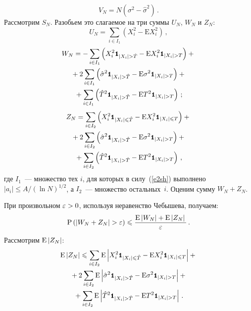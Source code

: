 \begin{multicols}{2}
\noindent
$$
V_N=N\left(\sigma^2-\hat{\sigma}^2\right)\,.
$$
Рассмотрим $S_N$. Разобьем это слагаемое на три суммы $U_N$, $W_N$ и $Z_N$:
$$
U_N=\sum\limits_{i\in I_1}\left(X_i^2-\mbox{E}X_i^2\right)\,,
$$
\begin{multline*}
W_N=-\sum\limits_{i\in I_1}\left(X_i^2\Ik_{|X_i|> \hat{T}}-\mbox{E}X_i^2\Ik_{|X_i|>T}\right)+{}\\
{}+2\sum\limits_{i\in I_1}\left(\hat{\sigma}^2\Ik_{|X_i|> \hat{T}}-\mbox{E}\sigma^2\Ik_{|X_i|> T}\right)+{}\\
{}+ \sum\limits_{i\in I_1}\left(\hat{T}^2\Ik_{|X_i|> 
\hat{T}}-\mbox{E}T^2\Ik_{|X_i|> T}\right)\,;
\end{multline*}
\begin{multline*}
Z_N=\sum\limits_{i\in I_2}\left(X_i^2\Ik_{|X_i|\leqslant 
\hat{T}}-\mbox{E}X_i^2\Ik_{|X_i|\leqslant T}\right)+{}\\
{}+
2\sum\limits_{i\in I_2}\left(\hat{\sigma}^2\Ik_{|X_i|> \hat{T}}-\mbox{E}\sigma^2\Ik_{|X_i|> T}\right)+{}\\
{}+\sum\limits_{i\in I_2}\left(\hat{T}^2\Ik_{|X_i|> \hat{T}}-\mbox{E}T^2\Ik_{|X_i|> T}\right)\,,
\end{multline*}
где $I_1$~--- множество тех $i$, для которых в силу~(\ref{e2sh}) выполнено 
$|a_i|\leqslant{A}/{(\ln N)^{1/2}}$, а $I_2$~--- множество остальных~$i$. 
Оценим сумму $W_N+Z_N$.

При произвольном $\varepsilon>0$, используя неравенство Чебышева, получаем:
$$
\mbox{P}\left(\left\vert W_N+Z_N\right\vert>\varepsilon\right)\leqslant
\displaystyle\frac{\displaystyle \mbox{E}\left\vert W_N\right\vert+\mbox{E}\left\vert Z_N\right\vert\mathstrut}{\displaystyle \varepsilon\mathstrut}\,.
$$
Рассмотрим $\mbox{E}\left\vert Z_N\right\vert$:
\begin{multline*}
\mbox{E}\abs{Z_N}\leqslant\sum\limits_{i\in I_2}\mbox{E}\abs{X_i^2\Ik_{|X_i|\leqslant 
\hat{T}}-\mbox{E}X_i^2\Ik_{|X_i|\leqslant T}}+{}\\
{}+2\sum\limits_{i\in I_2}\mbox{E}\abs{\hat{\sigma}^2\Ik_{|X_i|>\hat{T}}-
\mbox{E}\sigma^2\Ik_{|X_i|>T}}+{}\\
{}+
\sum\limits_{i\in I_2}\mbox{E}\abs{\hat{T}^2\Ik_{|X_i|>\hat{T}}-
\mbox{E}T^2\Ik_{|X_i|> T}}\,.
\end{multline*}


\end{multicols}
